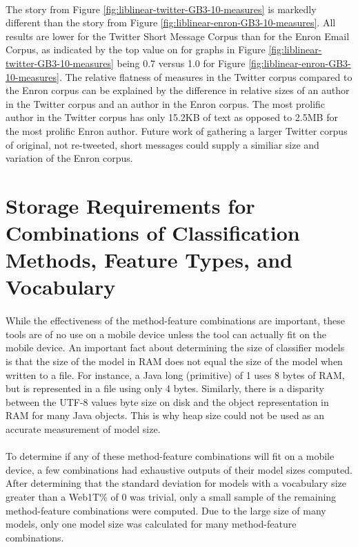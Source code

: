 	\paragraph*{} The story from Figure \ref{fig:liblinear-twitter-GB3-10-measures} is markedly different than the story from Figure \ref{fig:liblinear-enron-GB3-10-measures}.  All results are lower for the Twitter Short Message Corpus than for the Enron Email Corpus, as indicated by the top value on for graphs in Figure \ref{fig:liblinear-twitter-GB3-10-measures} being 0.7 versus 1.0 for Figure \ref{fig:liblinear-enron-GB3-10-measures}.  The relative flatness of measures in the Twitter corpus compared to the Enron corpus can be explained by the difference in relative sizes of an author in the Twitter corpus and an author in the Enron corpus.  The most prolific author in the Twitter corpus has only 15.2KB of text as opposed to 2.5MB for the most prolific Enron author.  Future work of gathering a larger Twitter corpus of original, not re-tweeted, short messages could supply a similiar size and variation of the Enron corpus.

\section{Storage Requirements for Combinations of Classification Methods, Feature Types, and Vocabulary}
	\paragraph*{} While the effectiveness of the method-feature combinations are important, these tools are of no use on a mobile device unless the tool can actually fit on the mobile device.  An important fact about determining the size of classifier models is that the size of the model in RAM does not equal the size of the model when written to a file.  For instance, a Java long (primitive) of 1 uses 8 bytes of RAM, but is represented in a file using only 4 bytes.  Similarly, there is a disparity between the UTF-8 values byte size on disk and the object representation in RAM for many Java objects.  This is why heap size could not be used as an accurate measurement of model size.
	\paragraph*{}To determine if any of these method-feature combinations will fit on a mobile device, a few combinations had exhaustive outputs of their model sizes computed.  After determining that the standard deviation for models with a vocabulary size greater than a Web1T\% of 0 was trivial, only a small sample of the remaining method-feature combinations were computed.  Due to the large size of many models, only one model size was calculated for many method-feature combinations.  
